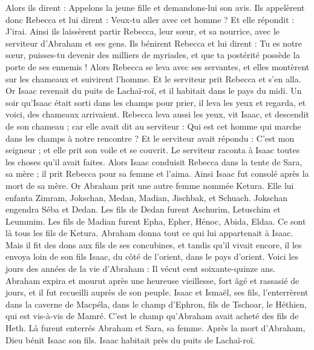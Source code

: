 \begin{multicols}{2}
Alors ils dirent : Appelons la jeune fille et demandons-lui son avis.
Ils appelèrent donc Rebecca et lui dirent : Veux-tu aller avec cet homme ? Et elle répondit : J'irai.
Ainsi ils laissèrent partir Rebecca, leur sœur, et sa nourrice, avec le serviteur d'Abraham et ses gens.
Ils bénirent Rebecca et lui dirent : Tu es notre sœur, puisses-tu devenir des milliers de myriades, et que ta postérité possède la porte de ses ennemis !
Alors Rebecca se leva avec ses servantes, et elles montèrent sur les chameaux et suivirent l'homme. Et le serviteur prit Rebecca et s'en alla.
Or Isaac revenait du puits de Lachaï-roï, et il habitait dans le pays du midi.
Un soir qu'Isaac était sorti dans les champs pour prier, il leva les yeux et regarda, et voici, des chameaux arrivaient.
Rebecca leva aussi les yeux, vit Isaac, et descendit de son chameau ;
car elle avait dit au serviteur : Qui est cet homme qui marche dans les champs à notre rencontre ? Et le serviteur avait répondu : C'est mon seigneur ; et elle prit son voile et se couvrit.
Le serviteur raconta à Isaac toutes les choses qu'il avait faites.
Alors Isaac conduisit Rebecca dans la tente de Sara, sa mère ; il prit Rebecca pour sa femme et l'aima. Ainsi Isaac fut consolé après la mort de sa mère.
\VerseOne{}Or Abraham prit une autre femme nommée Ketura.
Elle lui enfanta Zimram, Jokschan, Medan, Madian, Jischbak, et Schuach.
Jokschan engendra Séba et Dedan. Les fils de Dedan furent Aschurim, Letuschim et Leummim.
Les fils de Madian furent Epha, Epher, Hénoc, Abida, Eldaa. Ce sont là tous les fils de Ketura.
Abraham donna tout ce qui lui appartenait à Isaac.
Mais il fit des dons aux fils de ses concubines, et tandis qu'il vivait encore, il les envoya loin de son fils Isaac, du côté de l'orient, dans le pays d'orient.
Voici les jours des années de la vie d'Abraham : Il vécut cent soixante-quinze ans.
Abraham expira et mourut après une heureuse vieillesse, fort âgé et rassasié de jours, et il fut recueilli auprès de son peuple.
Isaac et Ismaël, ses fils, l'enterrèrent dans la caverne de Macpéla, dans le champ d'Ephron, fils de Tschoar, le Héthien, qui est vis-à-vis de Mamré.
C'est le champ qu'Abraham avait acheté des fils de Heth. Là furent enterrés Abraham et Sara, sa femme.
Après la mort d'Abraham, Dieu bénit Isaac son fils. Isaac habitait près du puits de Lachaï-roï.

\end{multicols}

